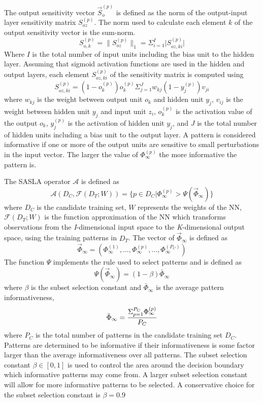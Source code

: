 \documentclass[conference]{IEEEtran}
\begin{document}
	The output sensitivity vector $\vec{S}_o^{(p)}$ is defined as the norm of the output-input layer sensitivity matrix $S_{oz}^{(p)}$. The norm used to calculate each element $k$ of the output sensitivity vector is the sum-norm.
	$$
	S_{o,k}^{(p)}=\lVert S_{oz}^{(p)}\lVert_1 = \Sigma_{i=1}^I \lvert S_{oz,ki}^{(p)}\lvert
	$$
	Where $I$ is the total number of input units including the bias unit to the hidden layer.
	Assuming that sigmoid activation functions are used in the hidden and output layers, each element $S_{oz,ki}^{(p)}$ of the sensitivity matrix is computed using
	$$
	S_{oz,ki}^{(p)}=(1-o_k^{(p)})o_k^{(p)}\Sigma_{j=1}^Jw_{kj}(1-y_j^{(p)})v_{ji}
	$$
	where $w_{kj}$ is the weight between output unit $o_k$ and hidden unit $y_j$, $v_{ij}$ is the weight between hidden unit $y_j$ and input unit $z_{i}$, $o_k^{(p)}$ is the activation value of the output $o_k$, $y_j^{(p)}$ is the activation of hidden unit $y_j$, and $J$ is the total number of hidden units including a bias unit to the output layer.
	A pattern is considered informative if one or more of the output units are sensitive to small perturbations in the input vector. The larger the value of $\Phi_\infty^{(p)}$ the more informative the pattern is.
	
	The SASLA operator $\mathcal{A}$ is defined as 
	$$
	\mathcal{A}(D_C, \mathcal{F}(D_T;W)) = \{p\in D_C | \Phi_\infty^{(p)}>\Psi(\vec\Phi_\infty)\}
	$$
	where $D_C$ is the candidate training set, $W$ represents the weights of the NN, $\mathcal{F}(D_T;W)$ is the function approximation of the NN which transforms observations from the \textit{I}-dimensional input space to the \textit{K}-dimensional output space, using the training patterns in $D_T$. The vector of $\vec{\Phi}_\infty$ is defined as
	$$
	\vec{\Phi}_\infty = (\Phi_\infty^{(1)},...,\Phi_\infty^{(p)},...,\Phi_\infty^{(P_C)})
	$$
	The function $\Psi$ implements the rule used to select patterns and is defined as
	$$
	\Psi(\vec\Phi_\infty)=(1-\beta)\bar{\Phi}_\infty
	$$
	where $\beta$ is the subset selection constant and $\bar{\Phi}_\infty$ is the average pattern informativeness,
	$$
	\Bar{\Phi}_\infty = \frac{\Sigma_{p=1}^{P_C}\Phi_\infty^{(p)}}{P_C}
	$$
	where $P_C$ is the total number of patterns in the candidate training set $D_C$. Patterns are determined to be informative if their informativeness is some factor larger than the average informativeness over all patterns. The subset selection constant $\beta \in [0, 1]$ is used to control the area around the decision boundary which informative patterns may come from. A larger subset selection constant will allow for more informative patterns to be selected. A conservative choice for the subset selection constant is $\beta=0.9$
	
\end{document}
